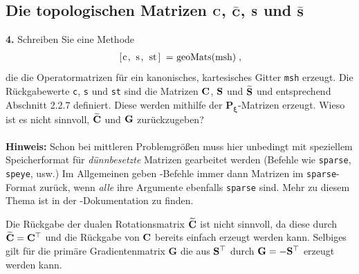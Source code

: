 \documentclass[Protokollheft.tex]{subfiles}
\begin{document}
%
    {\subsection{Die topologischen Matrizen $\mathbf{C}$, $\widetilde{\mathbf{C}}$, $\mathbf{S}$ und $\widetilde{\mathbf{S}}$}}

        \begin{framed}
	\noindent \textbf{4.} Schreiben Sie eine Methode
                    \begin{align}
                        \lstinline{[c, s, st] = geoMats(msh)} \; ,
                    \end{align}
                    die die Operatormatrizen für ein kanonisches, kartesisches
                    Gitter \lstinline{msh} erzeugt. Die Rückgabewerte
                    \lstinline{c}, \lstinline{s} und \lstinline{st}
                    sind die Matrizen $\mathbf{C}$, $\mathbf{S}$ und $\widetilde{\mathbf{S}}$
                    und entsprechend Abschnitt 2.2.7 definiert. Diese werden mithilfe der
${\mathbf{P_\xi}}$-Matrizen erzeugt.
                    Wieso ist es nicht sinnvoll, $\widetilde{\mathbf{C}}$ und $\mathbf{G}$ zurückzugeben?\\
                    \ \\
                    {\textbf{Hinweis:}} Schon bei mittleren Problemgrößen muss hier
                    unbedingt mit  speziellem Speicherformat für
                    \emph{dünnbesetzte} Matrizen gearbeitet werden (Befehle wie
                    \lstinline{sparse}, \lstinline{speye}, usw.) Im Allgemeinen geben
                    \matlab-Befehle immer dann Matrizen im \lstinline{sparse}-Format
                    zurück, wenn \emph{alle} ihre Argumente ebenfalls \lstinline{sparse}
                    sind. Mehr zu diesem Thema ist in der \matlab-Dokumentation zu finden.\label{exer:geoMats}
\end{framed}
\noindent
Die Rückgabe der dualen Rotationsmatrix $\widetilde{\mathbf{C}}$ ist nicht sinnvoll, da diese durch $\widetilde{\mathbf{C}} = \mathbf{C}^{\top}$ und die Rückgabe von $\mathbf{C}$ bereits einfach erzeugt werden kann. Selbiges gilt für die primäre Gradientenmatrix $\mathbf{G}$ die aus $\mathbf{S}^{\top}$ durch $\mathbf{G} = -\mathbf{S}^{\top}$ erzeugt werden kann. 
\end{document}
